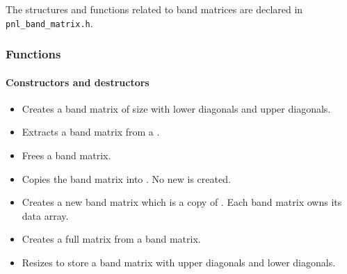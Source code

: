 The structures and functions related to band matrices are declared in
\verb!pnl_band_matrix.h!. 


\subsubsection{Functions}
\paragraph{Constructors and destructors}
\begin{itemize}
\item {}
  \sshortdescribe Creates a band matrix of size  with  lower
  diagonals and  upper diagonals.

\item {}
  \sshortdescribe Extracts a band matrix from a .

\item {}
  \sshortdescribe Frees a band matrix.

\item {}
  \sshortdescribe Copies the band matrix  into . No new
   is created.

\item {}
  \sshortdescribe Creates a new band matrix which is a copy of . Each
  band matrix owns its data array.

\item {}
  \sshortdescribe Creates a full matrix from a band matrix.

\item {}
  \sshortdescribe Resizes  to store a  band matrix with
   upper diagonals and  lower diagonals.
\end{itemize}
